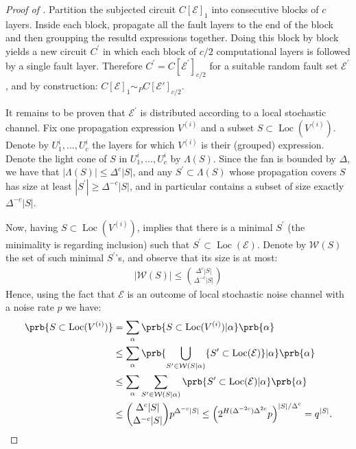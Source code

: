 \documentclass[manuscript,screen,review]{acmart}
\begin{document}
\begin{proof}[Proof of ]
  Partition the subjected circuit $C[\mathcal{E}]_{1}$ into consecutive blocks of $c$ layers. Inside each block, propagate all the fault layers to the end of the block and then groupping the resultd expressions together. Doing this block by block yields a new circuit $C^{\prime}$ in which each block of $c/2$ computational layers is followed by a single fault layer. Therefore $C^{\prime} = C[\mathcal{E}^{\prime}]_{c/2}$ for a suitable random fault set $\mathcal{E}^{\prime}$, and by construction: $C[\mathcal{E}]_{1} \sim_{P} C[\mathcal{E}']_{c/2}$. 
  


It remains to be proven that $\mathcal{E}^{\prime}$ is distributed according to a local stochastic channel. Fix one propagation expression $V^{(i)}$ and a subset $S \subset \operatorname{Loc}(V^{(i)})$. Denote by $U_{1}^{i}, \ldots, U_{c}^{i}$ the layers for which $V^{(i)}$ is their (grouped) expression. Denote the light cone of $S$ in $U_{1}^{i}, \ldots, U_{c}^{i}$ by $\Lambda(S)$. Since the fan is bounded by $\Delta$, we have that $|\Lambda(S)| \le \Delta^{c}|S|$, and any $S^{\prime} \subset \Lambda(S)$ whose propagation covers $S$ has size at least $|S^{\prime}| \ge \Delta^{-c}|S|$, and in particular contains a subset of size exactly $\Delta^{-c}|S|$.
  
Now, having $S \subset \operatorname{Loc}(V^{(i)})$, implies that there is a minimal $S^{\prime}$ (the minimality is regarding inclusion) such that $S^{\prime} \subset \operatorname{Loc}(\mathcal{E})$. Denote by $\mathcal{W}(S)$ the set of such minimal $S^{\prime}$'s, and observe that its size is at most:
    \begin{equation*}
      \begin{split}
 |\mathcal{W}(S)| \le { \Delta^{c}|S| \choose \Delta^{-c}|S| } 
      \end{split}
    \end{equation*}
    Hence, using the fact that $\mathcal{E}$ is an outcome of local stochastic noise channel with a noise rate $p$ we have:
  \begin{equation*}
    \begin{split}
      \prb{S\subset \operatorname{Loc}(V^{(i)})} &= \sum_{\alpha}\prb{S\subset \operatorname{Loc}(V^{(i)}) | \alpha } \prb{ \alpha } \\
      &\le
      \sum_{\alpha}\prb{\bigcup_{S'\in \mathcal{W}(S|\alpha)}\{S'\subset \operatorname{Loc}(\mathcal{E})\}| \alpha } \prb{\alpha} \\
      &\le
      \sum_{\alpha}\sum_{S'\in \mathcal{W}(S|\alpha)} \prb{S'\subset \operatorname{Loc}(\mathcal{E}) | \alpha} \prb{\alpha} \\
      & \le { \Delta^{c}|S| \choose \Delta^{-c}|S| } p^{\Delta^{-c}|S| } \le \left(2^{H(\Delta^{-2c})\Delta^{2c}}p\right)^{|S|/\Delta^{c}}
      = q^{|S|}.
    \end{split}
  \end{equation*}
\end{proof}

\printbibliography
%
% 
\end{document}
